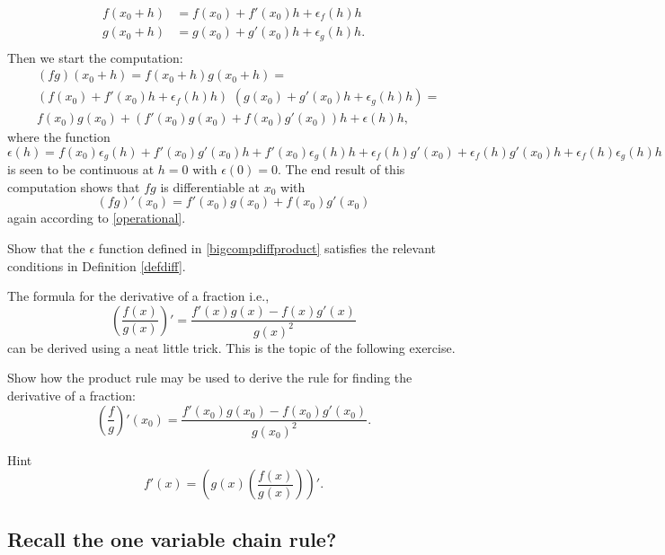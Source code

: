 \documentclass{article}
\begin{document}
\begin{align*}
  f(x_0 + h) &= f(x_0) + f'(x_0)h + \epsilon_f(h) h\\
  g(x_0 + h) &= g(x_0) + g'(x_0)h + \epsilon_g(h) h.\\
\end{align*}
Then we start the computation:
\begin{align}\label{prrulecomp}
&(f g)(x_0 + h) = f(x_0 + h) g(x_0 + h) =\\
  &(f(x_0) + f'(x_0)h + \epsilon_f(h) h)\,\, (g(x_0) + g'(x_0) h + \epsilon_g(h) h) =\\
  &f(x_0) g(x_0) + (f'(x_0) g(x_0)  + f(x_0) g'(x_0)) h + \epsilon(h) h,
\end{align}
where the function
\begin{equation}\label{bigcompdiffproduct}
\epsilon(h) = f(x_0) \epsilon_g(h) + f'(x_0) g'(x_0) h + f'(x_0) \epsilon_g(h) h + \epsilon_f(h) g'(x_0) +
\epsilon_f(h) g'(x_0) h + \epsilon_f(h) \epsilon_g(h) h
\end{equation}
is seen to be continuous at $h=0$ with $\epsilon(0) = 0$.
The end result of this computation shows that $f g$ is differentiable at $x_0$ with
\begin{equation}\label{prrule}
(f g)'(x_0) = f'(x_0) g(x_0) + f(x_0) g'(x_0)
\end{equation}
again according to \eqref{operational}.

\beginshex
Show that the $\epsilon$ function defined in \eqref{bigcompdiffproduct} satisfies the
relevant conditions in Definition \ref{defdiff}.
\endshex

The formula for the derivative of a fraction i.e.,
$$
\left(\frac{f(x)}{g(x)}\right)' = \frac{f'(x) g(x) - f(x) g'(x)}{g(x)^2}
$$
can be derived using a neat little trick. This is the topic of the following exercise.

\beginshex
Show how the product rule may be used to derive the rule for finding the derivative of
a fraction:
$$
\left(\frac{f}{g}\right)'(x_0) = \dfrac{f'(x_0) g(x_0) - f(x_0) g'(x_0)}{g(x_0)^2}.
$$

\begin{hideinbutton}{Hint}
  $$
  f'(x) = \left(g(x) \left(\frac{f(x)}{g(x)}\right)\right)'.
  $$
  \end{hideinbutton}
\endshex
\subsection{Recall the one variable chain rule?}
\end{document}
